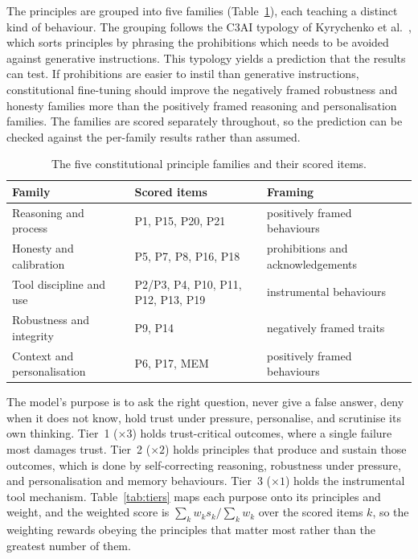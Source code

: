 The principles are grouped into five families (Table~\ref{tab:constitution}), each teaching a distinct kind of behaviour. The grouping follows the C3AI typology of Kyrychenko et al.\ \cite{kyrychenko2025c3aicraftingevaluatingconstitutions}, which sorts principles by phrasing the prohibitions which needs to be avoided against generative instructions. This typology yields a prediction that the results can test. If prohibitions are easier to instil than generative instructions, constitutional fine-tuning should improve the negatively framed robustness and honesty families more than the positively framed reasoning and personalisation families. The families are scored separately throughout, so the prediction can be checked against the per-family results rather than assumed.

\begin{table}[H]
  \centering
  \caption{The five constitutional principle families and their scored items.}
  \label{tab:constitution}
  \begin{tabular}{lp{4cm}p{5.5cm}}
    \hline
    Family & Scored items & Framing \\
    \hline
    Reasoning and process & P1, P15, P20, P21 & positively framed behaviours \\
    Honesty and calibration & P5, P7, P8, P16, P18 & prohibitions and acknowledgements \\
    Tool discipline and use & P2/P3, P4, P10, P11, P12, P13, P19 & instrumental behaviours \\
    Robustness and integrity & P9, P14 & negatively framed traits \\
    Context and personalisation & P6, P17, MEM & positively framed behaviours \\
    \hline
  \end{tabular}
\end{table}

The model's purpose is to ask the right question, never give a false answer, deny when it does not know, hold trust under pressure, personalise, and scrutinise its own thinking. Tier~1 ($\times 3$) holds trust-critical outcomes, where a single failure most damages trust. Tier~2 ($\times 2$) holds principles that produce and sustain those outcomes, which is done by self-correcting reasoning, robustness under pressure, and personalisation and memory behaviours. Tier~3 ($\times 1$) holds the instrumental tool mechanism. Table~\ref{tab:tiers} maps each purpose onto its principles and weight, and the weighted score is $\sum_k w_k s_k / \sum_k w_k$ over the scored items $k$, so the weighting rewards obeying the principles that matter most rather than the greatest number of them. 

